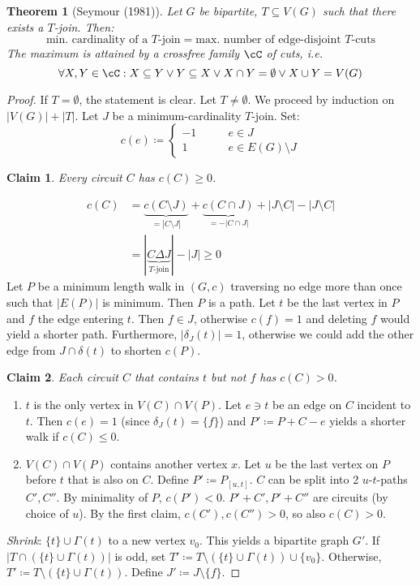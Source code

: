 \documentclass[11pt, a4paper]{article}
\newcommand{\abs}[1]{\left\lvert#1\right\rvert}
\newcommand{\set}[1]{\{#1\}}
\newtheorem{theorem}{Theorem}[section]
\newtheorem*{claim}{Claim}
\theoremstyle{remark}
\theoremstyle{definition}
\begin{document}
\begin{theorem}[Seymour (1981)]\label{thm:seymour-join-cut}
	Let $G$ be bipartite, $T\subseteq V(G)$ such that there exists a
	$T$-join. Then:
	\[\text{min. cardinality of a $T$-join}=\text{max. number of
			edge-disjoint $T$-cuts}\]
	The maximum is attained by a crossfree family $\cC$ of cuts, i.e.
	\[\forall X,Y\in\cC: X\subseteq Y\lor Y\subseteq X \lor X\cap Y=\emptyset
		\lor X\cup Y=V(G)\]
\end{theorem}
\begin{proof}
	If $T=\emptyset$, the statement is clear.
	Let $T\neq\emptyset$. We proceed by induction on $\abs{V(G)}+\abs{T}$.
	Let $J$ be a minimum-cardinality $T$-join. Set:
	\[c(e)\coloneqq \begin{cases}
			-1 \qquad & e\in J               \\
			1 \qquad  & e\in E(G)\setminus J
		\end{cases}\]
	\begin{claim}
		Every circuit $C$ has $c(C)\geq0$.
	\end{claim}
	\begin{align*}
		c(C) & =\underbrace{c(C\setminus J)}_{=\abs{C\setminus J}}+\underbrace{c(C\cap J)}_{=-\abs{C\cap J}}+\abs{J\setminus C}-\abs{J\setminus C} \\
		     & =\abs{\underbrace{C\Delta J}_{T\text{-join}}}-\abs{J}\geq0
	\end{align*}
	Let $P$ be a minimum length walk in $(G,c)$ traversing no edge more than
	once such that $\abs{E(P)}$ is minimum. Then $P$ is a path. Let $t$ be
	the last vertex in $P$ and $f$ the edge entering $t$. Then $f\in J$,
	otherwise $c(f)=1$ and deleting $f$ would yield a shorter path.
	Furthermore, $\abs{\delta_J(t)}=1$, otherwise we could add the other edge
	from $J\cap\delta(t)$ to shorten $c(P)$.

	\begin{claim}
		Each circuit $C$ that contains $t$ but not $f$ has $c(C)>0$.
	\end{claim}
	\begin{enumerate}
		\item[Case 1:] $t$ is the only vertex in $V(C)\cap V(P)$. Let $e\ni t$ be
		an edge on $C$ incident to $t$. Then $c(e)=1$ (since
		$\delta_J(t)=\set{f}$) and $P'\coloneqq P+C-e$ yields a shorter walk
		if $c(C)\leq0$.

		\item[Case 2:] $V(C)\cap V(P)$ contains another vertex $x$. Let $u$ be the
		last vertex on $P$ before $t$ that is also on $C$. Define
		$P'\coloneqq P_{[u,t]}$. $C$ can be split into 2 $u$-$t$-paths
		$C',C''$. By minimality of $P$, $c(P')<0$. $P'+C',P'+C''$ are
		circuits (by choice of $u$). By the first claim, $c(C'),c(C'')>0$, so
		also $c(C)>0$.
	\end{enumerate}
	\emph{Shrink}: $\set{t}\cup\Gamma(t)$ to a new vertex $v_0$. This yields
	a bipartite graph $G'$. If $\abs{T\cap (\set{t}\cup \Gamma(t))}$ is odd,
	set $T'\coloneqq T\setminus(\set{t}\cup\Gamma(t))\cup\set{v_0}$. Otherwise,
	$T'\coloneqq T\setminus(\set{t}\cup\Gamma(t))$. Define $J'\coloneqq J\setminus
		\set{f}$.


\end{proof}
\end{document}

